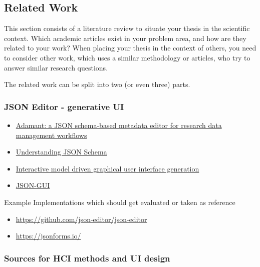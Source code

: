 \subsection{Related Work}
\label{sec:relatedwork}
This section consists of a literature review to situate your thesis in the scientific context. Which academic articles exist in your problem area, and how are they related to your work? When placing your thesis in the context of others, you need to consider other work, which uses a similar methodology or articles, who try to answer similar research questions.

The related work can be split into two (or even three) parts.

\subsubsection{JSON Editor - generative UI}

\begin{itemize}
	\item \href{https://f1000research.com/articles/11-475}{Adamant: a JSON schema-based metadata editor for research data management workflows}
	\item \href{https://json-schema.org/understanding-json-schema/UnderstandingJSONSchema.pdf}{Understanding JSON Schema}
	\item \href{https://www.researchgate.net/publication/220728636_Interactive_model_driven_graphical_user_interface_generation}{Interactive model driven graphical user interface generation }
	\item \href{https://www.sciencedirect.com/science/article/pii/S2352711018300505}{JSON-GUI}
\end{itemize}

Example Implementations which should get evaluated or taken as reference
\begin{itemize}
	\item \url{https://github.com/json-editor/json-editor}
	\item \url{https://jsonforms.io/}
\end{itemize}



\subsubsection{Sources for HCI methods and UI design}


